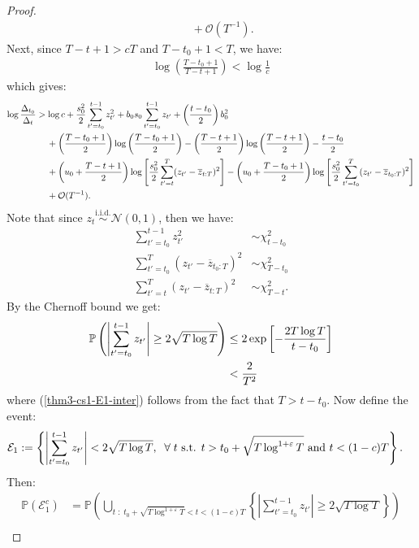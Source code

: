 \begin{proof}
\begin{align*}
    &\quad\: + \mathcal{O}(T^{-1}).
\end{align*}
Next, since $T-t+1 > cT$ and $T-t_0+1 < T$, we have:
\begin{align*}
    \log \left(\frac{T - t_0 + 1}{T - t+1} \right) < \log \frac{1}{c} 
\end{align*}
which gives: 
\begin{align}
    \log \frac{\Delta_{t_0}}{\Delta_t} &> \log c + \frac{s_0^2}{2} \sum_{t' = t_0}^{t - 1} z_{t'}^2 + b_0 s_0 \sum_{t' = t_0}^{t - 1} z_{t'} + \left(\frac{t-t_0}{2}\right)b_0^2 \notag \\
    &\quad\: + \left(\frac{T - t_0+1}{2}\right) \log\left(\frac{T-t_0+1}{2}\right) - \left(\frac{T - t+1}{2}\right) \log\left(\frac{T-t+1}{2}\right) - \frac{t-t_0}{2} \notag\\
    &\quad\: + \left(u_0 + \frac{T - t +1}{2}\right)\log\left[ \frac{s_0^2}{2}\sum_{t'=t}^T (z_{t'} - \overline{z}_{t:T})^2 \right]  - \left(u_0 + \frac{T - t_0 +1}{2}\right)\log\left[\frac{s_0^2}{2}\sum_{t'=t_0}^T (z_{t'} - \overline{z}_{t_0:T})^2 \right] \notag\\
    &\quad\: + \mathcal{O}(T^{-1}). \label{eq:thm3-cs1-bd1}
\end{align}
Note that since $z_t \overset{\text{i.i.d.}}{\sim} \mathcal{N}(0,1)$, then we have:
\begin{align*}
    \sum_{t'=t_0}^{t-1} z^2_{t'} &\sim \chi^2_{t-t_0} \\
    \sum_{t'=t_0}^T (z_{t'} - \overline{z}_{t_0:T})^2 &\sim \chi^2_{T-t_0} \\
    \sum_{t'=t}^T (z_{t'} - \overline{z}_{t:T})^2 &\sim \chi^2_{T-t}. 
\end{align*}
By the Chernoff bound we get:
\begin{align}
    \mathbb{P}\left(\left|\sum_{t'=t_0}^{t-1} z_{t'}\right| \geq 2\sqrt{T \log T}\right) &\leq 2\exp\left[-\frac{2 T\log T}{t-t_0}\right] \notag \\
    &<  \frac{2}{T^2} \label{thm3-cs1-E1-inter}
\end{align}
where (\ref{thm3-cs1-E1-inter}) follows from the fact that $T > t-t_0$. Now define the event:
\begin{align*}
    \mathcal{E}_1 &:= \left\{\left|\sum_{t'=t_0}^{t-1} z_{t'}\right| < 2\sqrt{T \log T}, \; \;\forall\; t \text{ s.t. } t > t_0 + \sqrt{T\log^{1+\varepsilon}T} \text{ and } t < (1-c)T\right\}.
\end{align*}
Then:
\begin{align*}
    \mathbb{P}(\mathcal{E}^c_1) &= \mathbb{P}\left(\bigcup_{t\;:\; t_0 + \sqrt{T\log^{1+\varepsilon}T} < t < (1-c)T} \left\{\left|\sum_{t'=t_0}^{t-1} z_{t'}\right| \geq 2\sqrt{T \log T}\right\}\right) \\

\end{align*}
\end{proof}
